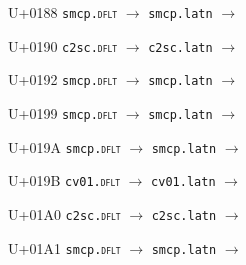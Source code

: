 \documentclass{article}
\begin{document}
\clearpage

\begin{substitutions}

U+0188  \linebreak
    \texttt{smcp.\textsc{dflt}} $\to$  \linebreak
    \texttt{smcp.latn} $\to$  

\goodbreak

U+0190  \linebreak
    \texttt{c2sc.\textsc{dflt}} $\to$  \linebreak
    \texttt{c2sc.latn} $\to$  

\goodbreak

U+0192  \linebreak
    \texttt{smcp.\textsc{dflt}} $\to$  \linebreak
    \texttt{smcp.latn} $\to$  

\goodbreak

U+0199  \linebreak
    \texttt{smcp.\textsc{dflt}} $\to$  \linebreak
    \texttt{smcp.latn} $\to$  

\goodbreak

U+019A  \linebreak
    \texttt{smcp.\textsc{dflt}} $\to$  \linebreak
    \texttt{smcp.latn} $\to$  

\goodbreak

U+019B  \linebreak
    \texttt{cv01.\textsc{dflt}} $\to$  \linebreak
    \texttt{cv01.latn} $\to$  

\goodbreak

U+01A0  \linebreak
    \texttt{c2sc.\textsc{dflt}} $\to$  \linebreak
    \texttt{c2sc.latn} $\to$  

\goodbreak

U+01A1  \linebreak
    \texttt{smcp.\textsc{dflt}} $\to$  \linebreak
    \texttt{smcp.latn} $\to$  


\end{substitutions}
\end{document}
